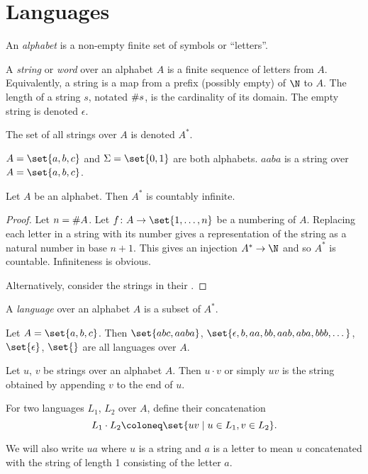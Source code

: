 \chapter{Languages} \label{chp:languages}

\begin{definition}
    An \emph{alphabet} is a non-empty finite set of symbols or ``letters''.

    A \emph{string} or \emph{word} over an alphabet $A$ is a finite sequence
    of letters from $A$.
    Equivalently, a string is a map from a prefix (possibly empty) of $\N$
    to $A$.
    The length of a string $s$, notated $\# s$, is the cardinality of its
    domain.
    The empty string is denoted $\epsilon$.

    The set of all strings over $A$ is denoted $A^*$.
\end{definition}
\begin{example}
    $A = \set{a, b, c}$ and $\Sigma = \set{0, 1}$ are both alphabets.
    $aaba$ is a string over $A = \set{a, b, c}$.
\end{example}

\begin{proposition}
    Let $A$ be an alphabet.
    Then $A^*$ is countably infinite.
\end{proposition}
\begin{proof}
    Let $n = \# A$.
    Let $f \colon A \to \set{1, \dots, n}$ be a numbering of $A$.
    Replacing each letter in a string with its number gives a representation
    of the string as a natural number in base $n + 1$.
    This gives an injection $A^* \to \N$ and so $A^*$ is countable.
    Infiniteness is obvious.

    Alternatively, consider the strings in their
    .
\end{proof}

\begin{definition}[Language] \label{def:languages:language}
    A \emph{language} over an alphabet $A$ is a subset of $A^*$.
\end{definition}
\begin{example}
    Let $A = \set{a, b, c}$.
    Then $\set{abc, aaba}$,
    $\set{\epsilon, b, aa, bb, aab, aba, bbb, \dots}$, $\set{\epsilon}$,
    $\set{}$ are all languages over $A$.
\end{example}

\begin{definition}[Concatenation] \label{def:languages:concatenation}
    Let $u$, $v$ be strings over an alphabet $A$.
    Then $u \cdot v$ or simply $uv$ is the string obtained by appending $v$
    to the end of $u$.

    For two languages $L_1$, $L_2$ over $A$, define their concatenation \[
        L_1 \cdot L_2 \coloneq \set{uv \mid u \in L_1, v \in L_2}.
    \]
\end{definition}
We will also write $ua$ where $u$ is a string and $a$ is a letter to mean
$u$ concatenated with the string of length 1 consisting of the letter $a$.

